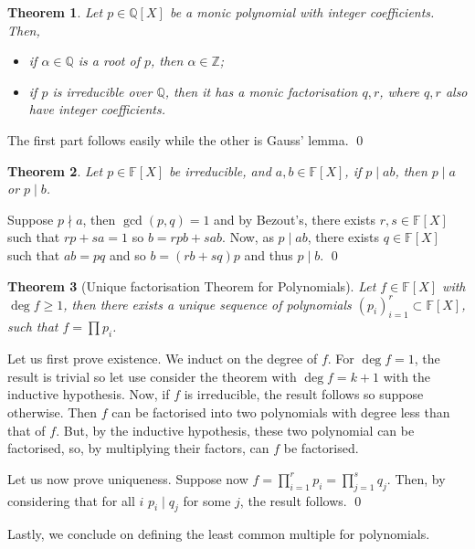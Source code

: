 \documentclass[
]{article}
\newtheorem{theorem}{Theorem}
\theoremstyle{definition}
\begin{document}
\begin{theorem}
  Let \(p \in \mathbb{Q}[X]\) be a monic polynomial with integer coefficients.
  Then, 
  \begin{itemize}
    \item if \(\alpha \in \mathbb{Q}\) is a root of \(p\), then 
      \(\alpha \in \mathbb{Z}\);
    \item if \(p\) is irreducible over \(\mathbb{Q}\), then it has a monic
      factorisation \(q, r\), where \(q, r\) also have integer coefficients. 
  \end{itemize}
\end{theorem}
\proof

The first part follows easily while the other is Gauss' lemma. \qed

\begin{theorem}
  Let \(p \in \mathbb{F}[X]\) be irreducible, and \(a, b \in \mathbb{F}[X]\), 
  if \(p \mid ab\), then \(p \mid a\) or \(p \mid b\).
\end{theorem}
\proof

Suppose \(p \nmid a\), then \(\gcd(p, q) = 1\) and by Bezout's, there
exists \(r, s \in \mathbb{F}[X]\) such that \(rp + sa = 1\) so
\(b = rpb + sab\). Now, as \(p \mid ab\), there exists
\(q \in \mathbb{F}[X]\) such that \(ab = pq\) and so \(b = (rb + sq)p\)
and thus \(p \mid b\). \qed

\begin{theorem}[Unique factorisation Theorem for Polynomials]
  Let \(f \in \mathbb{F}[X]\) with \(\deg f \ge 1\), then there exists a unique 
  sequence of polynomials \((p_i)_{i = 1}^r \subset \mathbb{F}[X]\), such that 
  \(f = \prod p_i\).
\end{theorem}
\proof

Let us first prove existence. We induct on the degree of \(f\). For
\(\deg f = 1\), the result is trivial so let use consider the theorem
with \(\deg f = k + 1\) with the inductive hypothesis. Now, if \(f\) is
irreducible, the result follows so suppose otherwise. Then \(f\) can be
factorised into two polynomials with degree less than that of \(f\).
But, by the inductive hypothesis, these two polynomial can be
factorised, so, by multiplying their factors, can \(f\) be factorised.

Let us now prove uniqueness. Suppose now
\(f = \prod_{i = 1}^r p_i =  \prod_{j = 1}^s q_j\). Then, by considering
that for all \(i\) \(p_i \mid q_j\) for some \(j\), the result follows.
\qed

Lastly, we conclude on defining the least common multiple for
polynomials.
\end{document}
